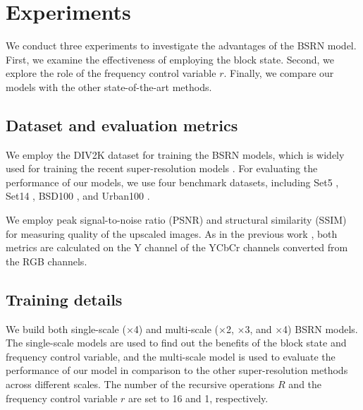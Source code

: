 \documentclass[runningheads]{llncs}
\begin{document}
\section{Experiments}
\label{sec:experiments}

We conduct three experiments to investigate the advantages of the BSRN model.
First, we examine the effectiveness of employing the block state.
Second, we explore the role of the frequency control variable $r$.
Finally, we compare our models with the other state-of-the-art methods.


\subsection{Dataset and evaluation metrics}

We employ the DIV2K dataset \cite{agustsson2017ntire} for training the BSRN models, which is widely used for training the recent super-resolution models \cite{ahn2018fast,kim2018deep}.
For evaluating the performance of our models, we use four benchmark datasets, including Set5 \cite{bevilacqua2012low}, Set14 \cite{zeyde2010single}, BSD100 \cite{martin2001database}, and Urban100 \cite{huang2015single}.

We employ peak signal-to-noise ratio (PSNR) and structural similarity (SSIM) \cite{wang2004image} for measuring quality of the upscaled images.
As in the previous work \cite{ahn2018fast,hui2018fast}, both metrics are calculated on the Y channel of the YCbCr channels converted from the RGB channels.



\subsection{Training details}

We build both single-scale ($\times$4) and multi-scale ($\times$2, $\times$3, and $\times$4) BSRN models.
The single-scale models are used to find out the benefits of the block state and frequency control variable, and the multi-scale model is used to evaluate the performance of our model in comparison to the other super-resolution methods across different scales.
The number of the recursive operations $R$ and the frequency control variable $r$ are set to 16 and 1, respectively.
\end{document}
